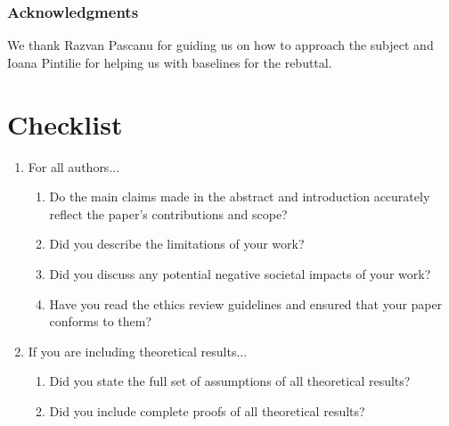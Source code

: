 \documentclass{article}
\begin{document}
\subsubsection*{Acknowledgments}
We thank Razvan Pascanu for guiding us on how to approach the subject and Ioana Pintilie for helping us with baselines for the rebuttal.






\clearpage
\section*{Checklist}



\begin{enumerate}

\item For all authors...
\begin{enumerate}
  \item Do the main claims made in the abstract and introduction accurately reflect the paper's contributions and scope? 
    \answerYes{}
  \item Did you describe the limitations of your work?
  \item Did you discuss any potential negative societal impacts of your work?
  
  \item Have you read the ethics review guidelines and ensured that your paper conforms to them?
    \answerYes{}
\end{enumerate}

\item If you are including theoretical results...
\begin{enumerate}
  \item Did you state the full set of assumptions of all theoretical results?
    \answerNA{}
	\item Did you include complete proofs of all theoretical results?
    \answerNA{}
\end{enumerate}


\end{enumerate}
\end{document}
